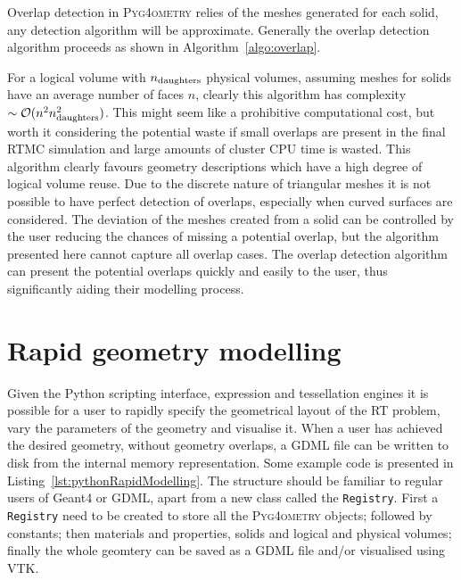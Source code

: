 \documentclass[final,5p,times,twocolumn]{elsarticle}
\newcommand{\pyinline}[1]{\lstinline[postbreak={}]{#1}}
\newcommand{\PYGEOMETRY}{\textsc{Pyg4ometry}}
\begin{document}
Overlap detection in \PYGEOMETRY{} relies of the meshes generated for each solid, 
any detection algorithm will be approximate. Generally the overlap detection 
algorithm proceeds as shown in Algorithm~\ref{algo:overlap}.

For a logical volume with $n_{\rm daughters}$ physical volumes, assuming meshes for solids have an average number of faces $n$, clearly this algorithm 
has complexity $\sim \mathcal{O}(n^2 n_{\rm daughters}^2)$. This might seem like a prohibitive computational cost, but worth it considering the potential 
waste if small overlaps are present in the final RTMC simulation and large amounts of cluster CPU time is wasted. This algorithm clearly favours geometry descriptions which have a high degree of logical volume reuse. Due to the discrete nature of triangular meshes it is not possible to have perfect detection 
of overlaps, especially when curved surfaces are considered. The deviation of the meshes created from a solid can be controlled by the user reducing the 
chances of missing a potential overlap, but the algorithm presented here cannot capture all overlap cases. The overlap detection algorithm can 
present the potential overlaps quickly and easily to the user, thus significantly aiding their modelling process. 


\section{Rapid geometry modelling}
Given the Python scripting interface, expression  and tessellation engines it is possible for a user to rapidly specify the geometrical layout of the RT problem, vary 
the parameters of the geometry and visualise it.  When a user has achieved the desired geometry, without geometry overlaps, a GDML file can be written to disk from the internal memory representation. Some example code is presented in Listing~\ref{lst:pythonRapidModelling}. The structure should be familiar to regular 
users of Geant4 or GDML, apart from a new class called the \pyinline{Registry}. First a \verb|Registry| need to be created to store all the \PYGEOMETRY{} objects; followed by constants;  then materials and properties, solids and logical and physical volumes; finally the whole geomtery can be saved as a GDML file and/or visualised using VTK.
\end{document}
